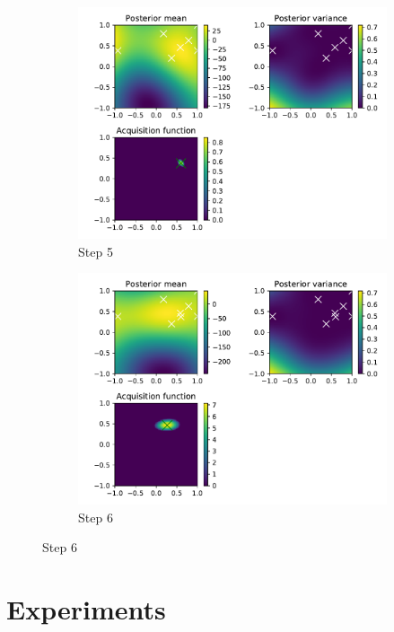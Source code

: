 \documentclass[10pt,a4paper,twoside]{book}
\begin{document}
\begin{figure}
	\begin{subfigure}[b]{0.45\textwidth}
		\caption{Step 5}
		\includegraphics[width=\textwidth]{figures/chapter3/rosen/4.pdf}
	\end{subfigure}
	\begin{subfigure}[b]{0.45\textwidth}
		\caption{Step 6}
		\includegraphics[width=\textwidth]{figures/chapter3/rosen/5.pdf}
	\end{subfigure}
\end{figure}

\printbibliography

\chapter{Experiments}
\end{document}
